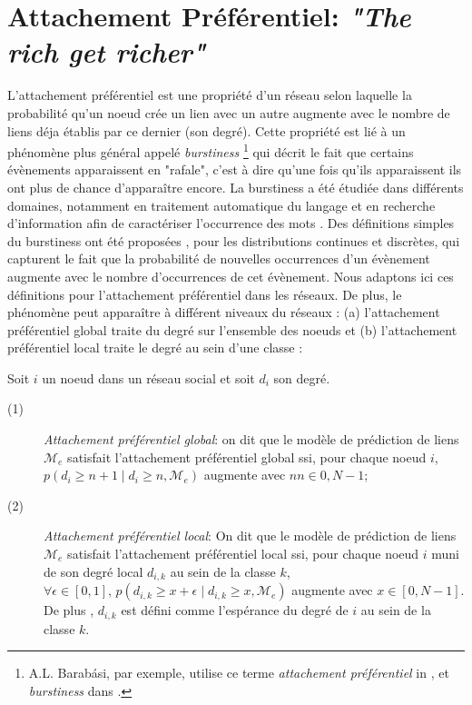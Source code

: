 \documentclass[french]{hermes-journal}
\newcommand{\pr}{p}
\begin{document}
\section{Attachement Préférentiel: \emph{"The rich get richer"}}
\label{sec:burstiness}


L'attachement préférentiel est une propriété d'un réseau selon laquelle la probabilité qu'un noeud crée un lien avec un autre augmente avec le nombre de liens déja établis par ce dernier (son degré). Cette propriété est lié à un phénomène plus général appelé \textit{burstiness} \footnote{A.L. Barab\'asi, par exemple, utilise ce terme \textit{attachement préférentiel} in \cite{barabasi1999emergence}, et \textit{burstiness} dans \cite{barabasi_burst}.} qui décrit le fait que certains évènements apparaissent en "rafale", c'est à dire qu'une fois qu'ils apparaissent ils ont plus de chance d'apparaître encore. La burstiness a été étudiée dans différents domaines, notamment en traitement automatique du langage et en recherche d'information afin de caractériser l'occurrence des mots \cite{church1995poisson}. Des définitions simples du burstiness ont été proposées \cite{clinchant2008bnb,clinchant2010information}, pour les distributions continues et discrètes, qui capturent le fait que la probabilité de nouvelles occurrences d'un évènement augmente avec le nombre d'occurrences de cet évènement. Nous adaptons ici ces définitions pour l'attachement préférentiel dans les réseaux. De plus, le phénomène peut apparaître à différent niveaux du réseaux : (a) l'attachement préférentiel global traite du degré sur l'ensemble des noeuds et (b) l'attachement préférentiel local traite le degré au sein d'une classe :


\begin{definition}
Soit $i$ un noeud dans un réseau social et soit $d_i$ son degré.
\begin{description}
    \item[(1)] \emph{Attachement préférentiel global}: on dit que le modèle de prédiction de liens $\mathcal{M}_e$ satisfait l'attachement préférentiel global ssi, pour chaque noeud $i$, $\pr(d_i \ge n+1 \mid d_i \ge n, \mathcal{M}_e)$ augmente avec $n n \in {0, N-1}$;
 \item[(2)] \emph{Attachement préférentiel local}: On dit que le modèle de prédiction de liens  $\mathcal{M}_e$ satisfait l'attachement préférentiel local ssi, pour chaque noeud $i$ muni de son degré local $d_{i,k}$  au sein de la classe $k$, $\forall \epsilon \in [0,1], \, \pr(d_{i,k} \ge x+\epsilon \mid d_{i,k} \ge x, \mathcal{M}_e)$  augmente avec $x \in [0,N-1]$. De plus , $d_{i,k}$ est défini comme l'espérance du degré de $i$ au sein de la classe $k$.
\end{description}
\label{def:burst-soc-net}
\end{definition}
\end{document}

